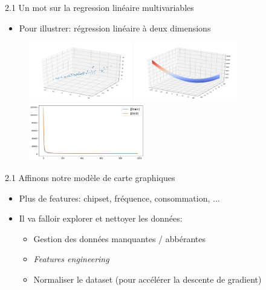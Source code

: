 \begin{frame}{2.1 Un mot sur la regression linéaire multivariables}
  \begin{itemize}
  \item Pour illustrer: régression linéaire à deux dimensions
  \end{itemize}
  \begin{figure}
    \includegraphics[width=0.4\textwidth]{figs/multiVarData.png}
    \includegraphics[width=0.4\textwidth]{figs/multiVarCostFct.png}\\
    \includegraphics[width=0.45\textwidth]{figs/multiVarDesc.png}
  \end{figure}
\end{frame}

\begin{frame}{2.1 Affinons notre modèle de carte graphiques}
  \begin{itemize}
  \item Plus de features: chipset, fréquence, consommation, ...
  \item Il va falloir explorer et nettoyer les données:
    \begin{itemize}
      \normalsize
    \item Gestion des données manquantes / abbérantes
    \item \textit{Features engineering}
    \item Normaliser le dataset (pour accélérer la descente de gradient)
    \end{itemize}
  \end{itemize}
\end{frame}

